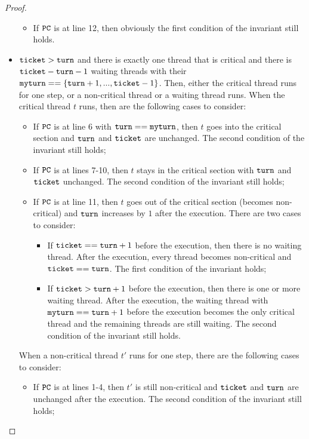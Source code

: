 \documentclass{article}[10pt]
\newcommand{\kwd}[1]{\ensuremath{\text{\ttfamily #1}}\xspace}
\def\kturn{\kwd{turn}}
\def\kmyturn{\kwd{myturn}}
\def\kticket{\kwd{ticket}}
\begin{document}
\begin{proof}
\begin{itemize}
\begin{itemize}
      \item If \kwd{PC} is at line 12, then obviously the first
        condition of the invariant still holds.

    \end{itemize}

  \item 
    $\kticket > \kturn$ and there is exactly one thread that is
    critical and there is $\kticket - \kturn - 1$ waiting threads with
    their $\kmyturn == \{\kturn+1,...,\kticket - 1\}$. Then, either
    the critical thread runs for one step, or a non-critical thread or
    a waiting thread runs.
    When the critical thread $t$ runs, then are the following cases
    to consider:
    \begin{itemize}
    \item If \kwd{PC} is at line 6 with $\kturn == \kmyturn$, then $t$
      goes into the critical section and \kturn and \kticket are
      unchanged. The second condition of the invariant still holds;

    \item If \kwd{PC} is at lines 7-10, then $t$ stays in the critical
      section with \kturn and \kticket unchanged. The second condition
      of the invariant still holds;

    \item If \kwd{PC} is at line 11, then $t$ goes out of the critical
      section (becomes non-critical) and $\kturn$ increases by $1$
      after the execution. There are two cases to consider:
      \begin{itemize}
      \item If $\kticket == \kturn +1$ before the execution, then
        there is no waiting thread. After the execution, every thread
        becomes non-critical and $\kticket == \kturn$. The first
        condition of the invariant holds;

      \item If $\kticket > \kturn +1$ before the execution, then there
        is one or more waiting thread. After the execution, the
        waiting thread with $\kmyturn == \kturn +1$ before the
        execution becomes the only critical thread and the remaining
        threads are still waiting. The second condition of the
        invariant still holds.

      \end{itemize}

    \end{itemize}
    When a non-critical thread $t'$ runs for one step, there are the
    following cases to consider:
    \begin{itemize}
    \item If \kwd{PC} is at lines 1-4, then $t'$ is still non-critical
      and \kticket and \kturn are unchanged after the execution. The
      second condition of the invariant still holds;


\end{itemize}
\end{itemize}
\end{proof}
\end{document}
